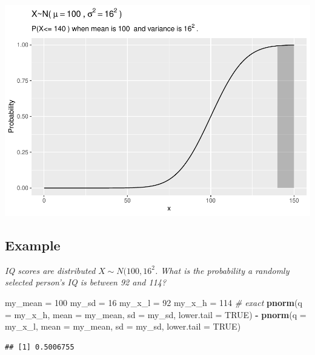 \documentclass[
]{book}
\newenvironment{Shaded}{\begin{snugshade}}{\end{snugshade}}
\newcommand{\CommentTok}[1]{\textcolor[rgb]{0.56,0.35,0.01}{\textit{#1}}}
\newcommand{\DataTypeTok}[1]{\textcolor[rgb]{0.13,0.29,0.53}{#1}}
\newcommand{\DecValTok}[1]{\textcolor[rgb]{0.00,0.00,0.81}{#1}}
\newcommand{\KeywordTok}[1]{\textcolor[rgb]{0.13,0.29,0.53}{\textbf{#1}}}
\newcommand{\NormalTok}[1]{#1}
\newcommand{\OperatorTok}[1]{\textcolor[rgb]{0.81,0.36,0.00}{\textbf{#1}}}
\newcommand{\OtherTok}[1]{\textcolor[rgb]{0.56,0.35,0.01}{#1}}
\newcommand{\StringTok}[1]{\textcolor[rgb]{0.31,0.60,0.02}{#1}}
\begin{document}
\includegraphics{data-sci_files/figure-latex/unnamed-chunk-14-1.pdf}

\hypertarget{example-2}{%
\subsection{Example}\label{example-2}}

\emph{IQ scores are distributed }\(X \sim N(100, 16^2\)\emph{. What is the probability a randomly selected person's IQ is between 92 and 114?}

\begin{Shaded}
\begin{Highlighting}[]
\NormalTok{my_mean =}\StringTok{ }\DecValTok{100}
\NormalTok{my_sd =}\StringTok{ }\DecValTok{16}
\NormalTok{my_x_l =}\StringTok{ }\DecValTok{92}
\NormalTok{my_x_h =}\StringTok{ }\DecValTok{114}
\CommentTok{# exact}
\KeywordTok{pnorm}\NormalTok{(}\DataTypeTok{q =}\NormalTok{ my_x_h, }\DataTypeTok{mean =}\NormalTok{ my_mean, }\DataTypeTok{sd =}\NormalTok{ my_sd, }\DataTypeTok{lower.tail =} \OtherTok{TRUE}\NormalTok{) }\OperatorTok{-}
\StringTok{  }\KeywordTok{pnorm}\NormalTok{(}\DataTypeTok{q =}\NormalTok{ my_x_l, }\DataTypeTok{mean =}\NormalTok{ my_mean, }\DataTypeTok{sd =}\NormalTok{ my_sd, }\DataTypeTok{lower.tail =} \OtherTok{TRUE}\NormalTok{)}
\end{Highlighting}
\end{Shaded}

\begin{verbatim}
## [1] 0.5006755
\end{verbatim}
\end{document}
